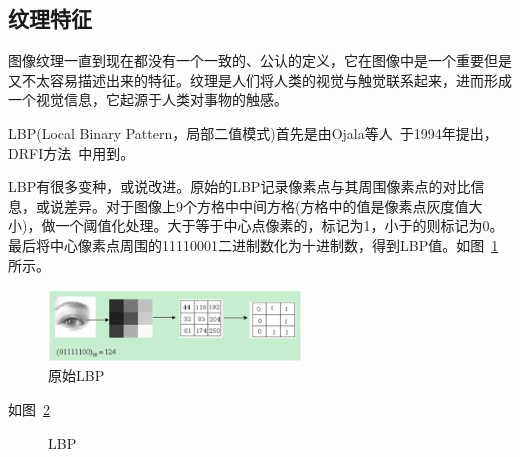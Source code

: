 \documentclass[12pt]{article}
\begin{document}
\subsection{纹理特征}

图像纹理一直到现在都没有一个一致的、公认的定义，它在图像中是一个重要但是又不太容易描述出来的特征。纹理是人们将人类的视觉与触觉联系起来，进而形成一个视觉信息，它起源于人类对事物的触感。

LBP(Local Binary Pattern，局部二值模式)首先是由Ojala等人~\cite{ojala1994performance}于1994年提出，DRFI方法~\cite{jiang2013salient}中用到。

LBP有很多变种，或说改进。原始的LBP记录像素点与其周围像素点的对比信息，或说差异。对于图像上9个方格中中间方格(方格中的值是像素点灰度值大小)，做一个阈值化处理。大于等于中心点像素的，标记为1，小于的则标记为0。最后将中心像素点周围的11110001二进制数化为十进制数，得到LBP值。如图~\ref{fig: LBP}所示。

\begin{figure}[!ht]
\centering
\includegraphics[width=0.6\textwidth]{LBP.png}
\caption{原始LBP}
\label{fig: LBP}
\end{figure} 

如图~\ref{fig: LBP特征}

\begin{figure}
  \centering 
  \caption{LBP}
  \label{fig: LBP特征} %
\end{figure}
\end{document}
